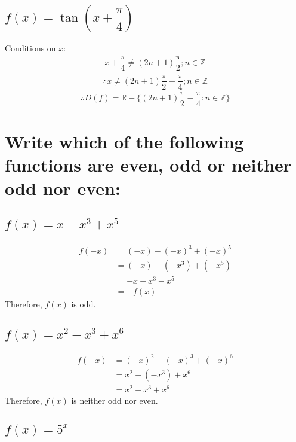 \documentclass[fleqn, a4paper, 10pt]{article}
\begin{document}
\subsection{$f(x) = \tan \left( x + \dfrac{\pi}{4} \right) $}

Conditions on $x$:
\begin{align}
	x + \dfrac{\pi}{4} \neq (2n+1)\dfrac{\pi}{2} ; n \in \mathbb{Z}
\end{align}
\begin{align*}
	\therefore x \neq (2n+1)\dfrac{\pi}{2} - \dfrac{\pi}{4}; n \in \mathbb{Z}
\end{align*}
\begin{equation*}
	\boxed{\therefore D(f) = \mathbb{R} - \{(2n+1)\dfrac{\pi}{2} - \dfrac{\pi}{4}: n \in \mathbb{Z}\}}
\end{equation*}

\newpage
\section{Write which of the following functions are even, odd or neither odd nor even:}

\subsection{$f(x) = x - x^3 +x^5$}

\begin{align*}
	f(-x) &= (-x) - (-x)^3 + (-x)^5\\
	&= (-x) - (-x^3) + (-x^5)\\
	&= -x + x^3 - x^5\\
	&= -f(x)
\end{align*} 
Therefore, $f(x)$ is odd.

\subsection{$f(x) = x^2 - x^3 + x^6$}

\begin{align*}
	f(-x) &= (-x)^2 - (-x)^3 + (-x)^6\\
	&= x^2 - (-x^3) + x^6\\
	&= x^2 + x^3 + x^6
\end{align*}
Therefore, $f(x)$ is neither odd nor even.

\subsection{$f(x) = 5^x$}
\end{document}
